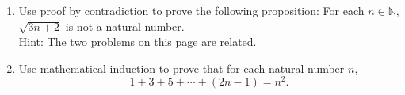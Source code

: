 \documentclass[12pt]{article}
\newcommand{\points}[1]{\marginpar{\hspace{24pt}[#1]}}
\newcommand{\N}{\mathbb{N}}
\begin{document}
\begin{enumerate}
\vspace{4in}


\item Use proof by contradiction to prove the following proposition: For each $n\in \N$, $\sqrt{3n+2}$ is not a natural number. \points{5}\\
Hint: The two problems on this page are related.

\newpage

\item Use mathematical induction to prove that for each natural number $n$, \points{6}
\[
1+3+5+\cdots + (2n-1) = n^2.
\]
\end{enumerate}
\end{document}
